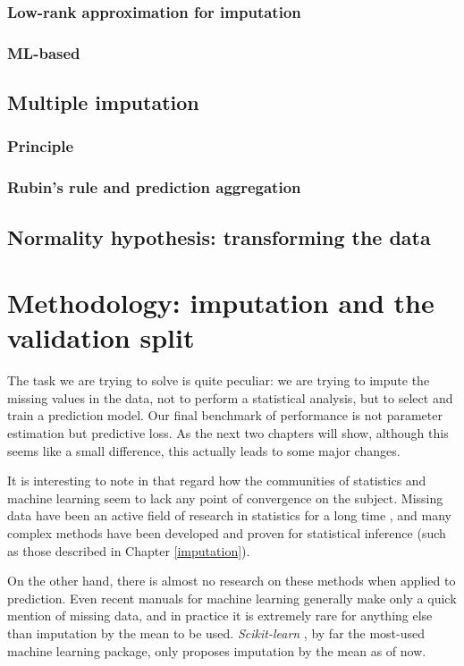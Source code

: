 \documentclass[12pt, a4paper]{memoir}
\begin{document}
		\subsection{Low-rank approximation for imputation}
		\subsection{ML-based}
	\section{Multiple imputation}
		\subsection{Principle}
		\subsection{Rubin's rule and prediction aggregation}
	\section{Normality hypothesis: transforming the data}
		
\chapter{Methodology: imputation and the validation split}
\label{validation}
The task we are trying to solve is quite peculiar: we are trying to impute the missing values in the data, not to perform a statistical analysis, but to select and train a prediction model. Our final benchmark of performance is not parameter estimation but predictive loss. As the next two chapters will show, although this seems like a small difference, this actually leads to some major changes.

It is interesting to note in that regard how the communities of statistics and machine learning seem to lack any point of convergence on the subject. Missing data have been an active field of research in statistics for a long time \cite{rubin1976inference}, and many complex methods have been developed and proven for statistical inference \cite{Rubin_missdata} (such as those described in Chapter \ref{imputation}).

On the other hand, there is almost no research on these methods when applied to prediction. Even recent manuals for machine learning \cite{ML_missdata} generally make only a quick mention of missing data, and in practice it is extremely rare for anything else than imputation by the mean to be used. \emph{Scikit-learn} \cite{scikit-learn}, by far the most-used machine learning package, only proposes imputation by the mean as of now. 
\end{document}
